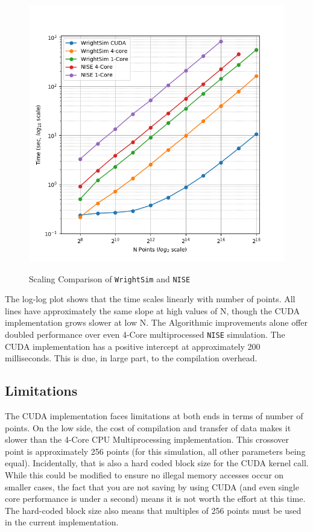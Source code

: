 \documentclass[fontsize=11pt]{scrartcl}
\numberwithin{equation}{section}		%
\numberwithin{figure}{section}			%
\numberwithin{table}{section}				%
\begin{document}
\begin{figure}[!htb]
    \centering
    \includegraphics[scale=1]{"Scaling"}
    \label{fig:scaling}
    \caption{Scaling Comparison of \texttt{WrightSim} and \texttt{NISE}}
\end{figure}

The log-log plot shows that the time scales linearly with number of points. All lines have approximately the same slope at high values of N, though the CUDA implementation grows slower at low N.
The Algorithmic improvements alone offer doubled performance over even 4-Core multiprocessed \texttt{NISE} simulation.
The CUDA implementation has a positive intercept at approximately 200 milliseconds.
This is due, in large part, to the compilation overhead.


\subsection{Limitations}

The CUDA implementation faces limitations at both ends in terms of number of points.
On the low side, the cost of compilation and transfer of data makes it slower than the 4-Core CPU Multiprocessing implementation.
This crossover point is approximately 256 points (for this simulation, all other parameters being equal).
Incidentally, that is also a hard coded block size for the CUDA kernel call.
While this could be modified to ensure no illegal memory accesses occur on smaller cases, the fact that you are not saving by using CUDA (and even single core performance is under a second) means it is not worth the effort at this time.
The hard-coded block size also means that multiples of 256 points must be used in the current implementation.
\end{document}
